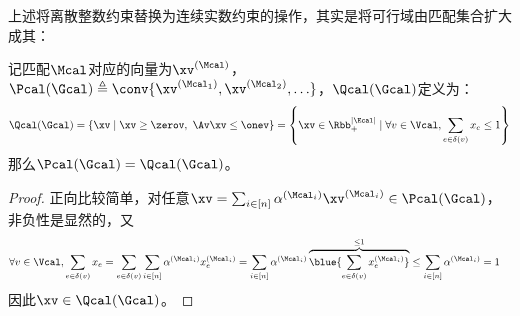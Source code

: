 \documentclass{ctexart}
\begin{document}
上述将离散整数约束替换为连续实数约束的操作，其实是将可行域由匹配集合扩大成其：

\begin{theorem}
    记匹配$\Mcal$对应的向量为$\xv^{(\Mcal)}$，$\Pcal (\Gcal) \triangleq \conv \{ \xv^{(\Mcal_1)}, \xv^{(\Mcal_2)}, \ldots \}$，$\Qcal (\Gcal)$定义为：
    \begin{align*}
        \Qcal (\Gcal) = \{ \xv \mid \xv \ge \zerov, ~ \Av \xv \le \onev \} = \left\{ \xv \in \Rbb_+^{|\Ecal|} \mid \forall v \in \Vcal, \sum_{e \in \delta(v)} x_e \le 1 \right\}
    \end{align*}
    那么$\Pcal (\Gcal) = \Qcal (\Gcal)$。
\end{theorem}

\begin{proof}
    正向比较简单，对任意$\xv = \sum_{i \in [n]} \alpha^{(\Mcal_i)} \xv^{(\Mcal_i)} \in \Pcal(\Gcal)$，非负性是显然的，又
    \begin{align*}
        \forall v \in \Vcal, \sum_{e \in \delta(v)} x_e & = \sum_{e \in \delta(v)} \sum_{i \in [n]} \alpha^{(\Mcal_i)} x^{(\Mcal_i)}_e = \sum_{i \in [n]} \alpha^{(\Mcal_i)} \overbrace{\blue{\sum_{e \in \delta(v)} x^{(\Mcal_i)}_e}}^{\le 1} \le \sum_{i \in [n]} \alpha^{(\Mcal_i)} = 1
    \end{align*}
    因此$\xv \in \Qcal (\Gcal)$。


\end{proof}
\end{document}
